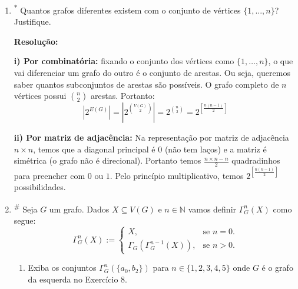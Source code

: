 \begin{enumerate}[label=\textbf{\arabic*.}, ref=\arabic*]
    
    \item\textsuperscript{*} Quantos grafos diferentes existem com o conjunto de vértices $\{1,...,n\}$? Justifique. 

    \noindent \textbf{Resolução:}
    
    \vspace{0.2cm}
    \noindent \textbf{i) Por combinatória:} fixando o conjunto dos vértices como $\{1,\dots,n\}$, o que vai diferenciar um grafo do outro é o conjunto de arestas. Ou seja, queremos saber quantos subconjuntos de arestas são possíveis. O grafo completo de $n$ vértices possui $\binom{n}{2}$ arestas. Portanto:
    $$| 2^{E(G)} | = \left| 2^{\binom{V(G)}{2}} \right| = 2^{\binom{n}{2}} = 2^{\left[ \frac{n(n-1)}{2} \right]}$$
    
    \vspace{0.2cm}
    \noindent \textbf{ii) Por matriz de adjacência:} Na representação por matriz de adjacência $n \times n$, temos que a diagonal principal é $0$ (não tem laços) e a matriz é simétrica (o grafo não é direcional). Portanto temos $\frac{n \times n - n}{2}$ quadradinhos para preencher com $0$ ou $1$. Pelo princípio multiplicativo, temos $2^{\left[ \frac{n(n-1)}{2} \right]}$ possibilidades.
    
    \item\textsuperscript{\#} Seja $G$ um grafo. Dados $X\subseteq V(G)$ e $n\in\mathbb{N}$ vamos definir $\Gamma_{G}^{n}(X)$ como segue:
    \begin{equation*}
    \Gamma_{G}^{n}(X):=\begin{cases}X,& \text{se } n=0.\\ \Gamma_{G}(\Gamma_{G}^{n-1}(X)),& \text{se } n>0.\end{cases}
    \end{equation*}
    
    \begin{enumerate}
        \item Exiba os conjuntos $\Gamma_{G}^{n}(\{a_{0},b_{2}\})$ para $n\in\{1,2,3,4,5\}$ onde $G$ é o grafo da esquerda no Exercício 8.
    

\end{enumerate}
\end{enumerate}
